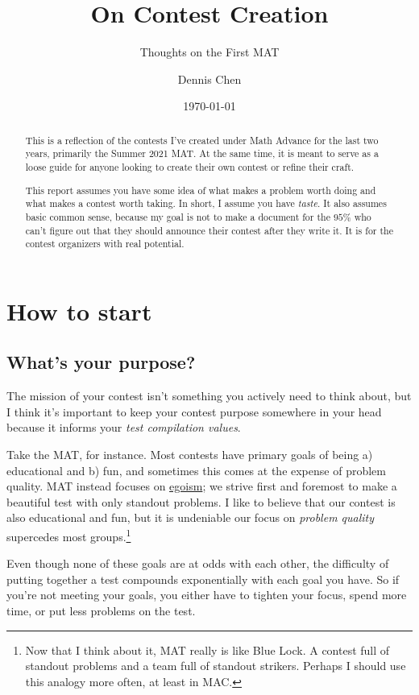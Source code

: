 \documentclass[points=false]{bounce}
\title{On Contest Creation}
\subtitle{Thoughts on the First MAT}
\author{Dennis Chen}
\date{\today}
\begin{document}
\maketitle

\begin{abstract}
    This is a reflection of the contests I've created under Math Advance for the last two years, primarily the Summer 2021 MAT. At the same time, it is meant to serve as a loose guide for anyone looking to create their own contest or refine their craft.

    This report assumes you have some idea of what makes a problem worth doing and what makes a contest worth taking. In short, I assume you have \emph{taste}. It also assumes basic common sense, because my goal is not to make a document for the $95\%$ who can't figure out that they should announce their contest after they write it. It is for the contest organizers with real potential.
\end{abstract}

\section{How to start}

\subsection{What's your purpose?}

The mission of your contest isn't something you actively need to think about, but I think it's important to keep your contest purpose somewhere in your head because it informs your \emph{test compilation values}.

Take the MAT, for instance. Most contests have primary goals of being a) educational and b) fun, and sometimes this comes at the expense of problem quality. MAT instead focuses on \href{https://myanimelist.net/manga/114745/Blue_Lock}{egoism}; we strive first and foremost to make a beautiful test with only standout problems. I like to believe that our contest is also educational and fun, but it is undeniable our focus on \emph{problem quality} supercedes most groups.\footnote{Now that I think about it, MAT really is like Blue Lock. A contest full of standout problems and a team full of standout strikers. Perhaps I should use this analogy more often, at least in MAC.}

Even though none of these goals are at odds with each other, the difficulty of putting together a test compounds exponentially with each goal you have. So if you're not meeting your goals, you either have to tighten your focus, spend more time, or put less problems on the test.
\end{document}
